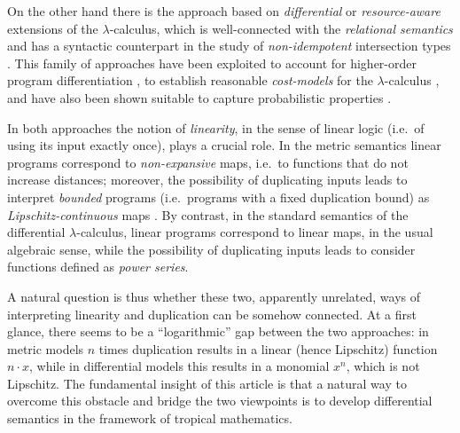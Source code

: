 On the other hand there is the approach based on \emph{differential} or \emph{resource-aware} extensions of the $\lambda$-calculus, which is well-connected with the \emph{relational semantics} \cite{Manzo2010, Manzo2013, dill} and has a syntactic counterpart in the study of \emph{non-idempotent} intersection types \cite{decarvalho2018}. This family of approaches have been exploited to account for higher-order program differentiation \cite{difflambda}, to establish reasonable \emph{cost-models} for the $\lambda$-calculus \cite{Accattoli2021}, and have also been shown suitable to capture probabilistic properties \cite{Manzo2013, Breuvart2018, PistoneLICS2022}. 


In both approaches the notion of \emph{linearity}, in the sense of linear logic \cite{girardLl} (i.e.~of using its input exactly once), plays a crucial role.
In the metric semantics linear programs correspond to \emph{non-expansive} maps, i.e.~to functions that do not increase distances; moreover, the possibility of duplicating inputs leads to interpret \emph{bounded} programs (i.e.~programs with a fixed duplication bound) as \emph{Lipschitz-continuous} maps \cite{Gaboardi2017}.
By contrast, in the standard semantics of the differential $\lambda$-calculus, linear programs correspond to linear maps, in the usual algebraic sense, while the possibility of duplicating inputs leads to consider functions defined as \emph{power series}.


A natural question is thus whether these two, apparently unrelated, ways of interpreting linearity and duplication can be somehow connected. At a first glance, there seems to be a  ``logarithmic'' gap between the two approaches:
in metric models $n$ times duplication results in a linear (hence Lipschitz) function $n\cdot x$, while in differential models this results in a monomial $x^{n}$, which is not Lipschitz. The fundamental insight of this article is that a natural way to overcome 
this obstacle and bridge the two viewpoints 
is to develop differential semantics in the framework of 
tropical mathematics.
%
%
%



